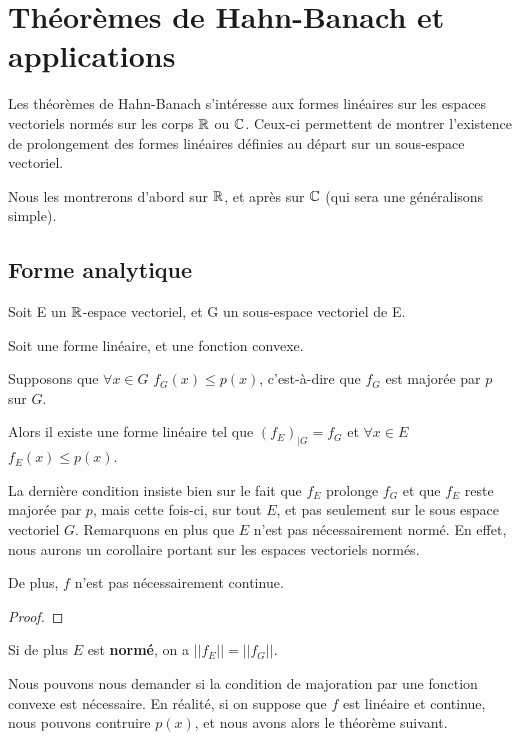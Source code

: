 \section{Théorèmes de Hahn-Banach et applications}

Les théorèmes de Hahn-Banach s'intéresse aux formes linéaires sur les espaces
vectoriels normés sur les corps $\mathbb{R}$ ou $\mathbb{C}$.
Ceux-ci permettent de montrer l'existence de prolongement des formes linéaires
définies au départ sur un sous-espace vectoriel.

Nous les montrerons d'abord sur $\mathbb{R}$, et après sur $\mathbb{C}$ (qui sera une
généralisons simple).

\subsection{Forme analytique}

\begin{theorem} 
	Soit E un $\mathbb{R}$-espace vectoriel, et G un sous-espace vectoriel de E.

	Soit  une forme linéaire, et
	 une fonction convexe.

	Supposons que $\forall x \in G$ $f_{G}(x) \leq p(x)$, c'est-à-dire que
	$f_{G}$ est majorée par $p$ sur $G$.

	Alors il existe une forme linéaire  tel que
	$(f_{E})_{|G} = f_{G}$ et $\forall x \in E$ $f_{E}(x) \leq p(x)$.
	\label{hahn-banach-analytic-1}
\end{theorem}

La dernière condition insiste bien sur le fait que $f_{E}$ prolonge $f_{G}$ et
que $f_{E}$ reste majorée par $p$, mais cette fois-ci, sur tout $E$, et pas
seulement sur le sous espace vectoriel $G$.
Remarquons en plus que $E$ n'est pas nécessairement normé. En effet, nous aurons
un corollaire portant sur les espaces vectoriels normés.

De plus, $f$ n'est pas nécessairement continue.

\begin{proof}
	
\end{proof}

\begin{corollary}
	Si de plus $E$ est \textbf{normé}, on a $||f_{E}|| = ||f_{G}||$.
\end{corollary}

Nous pouvons nous demander si la condition de majoration par une fonction
convexe est nécessaire. En réalité, si on suppose que $f$ est linéaire et
continue, nous pouvons contruire $p(x)$, et nous avons alors le théorème
suivant.

